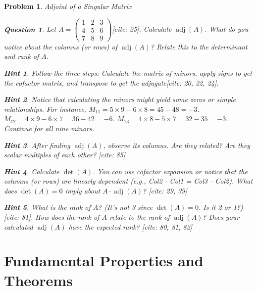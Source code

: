 \documentclass[12pt]{article}
\newtheorem{problem}{Problem}[section]
\newtheorem{question}{Question}[problem]
\theoremstyle{definition}
\newtheorem{hint}{Hint}[question]
\newcommand{\adj}{\operatorname{adj}}
\newcommand{\detm}{\operatorname{det}}
\begin{document}
\begin{problem}{Adjoint of a Singular Matrix}
    \begin{question}
        Let $A = \begin{pmatrix} 1 & 2 & 3 \\ 4 & 5 & 6 \\ 7 & 8 & 9 \end{pmatrix}$[cite: 25]. Calculate $\adj(A)$. What do you notice about the columns (or rows) of $\adj(A)$? Relate this to the determinant and rank of $A$.
    \end{question}
    
        \begin{hint}
            Follow the three steps: Calculate the matrix of minors, apply signs to get the cofactor matrix, and transpose to get the adjugate[cite: 20, 22, 24].
        \end{hint}
        \begin{hint}
            Notice that calculating the minors might yield some zeros or simple relationships. For instance, $M_{11} = 5 \times 9 - 6 \times 8 = 45 - 48 = -3$. $M_{12} = 4 \times 9 - 6 \times 7 = 36 - 42 = -6$. $M_{13} = 4 \times 8 - 5 \times 7 = 32 - 35 = -3$. Continue for all nine minors.
        \end{hint}
        \begin{hint}
            After finding $\adj(A)$, observe its columns. Are they related? Are they scalar multiples of each other? [cite: 85]
        \end{hint}
        \begin{hint}
            Calculate $\detm(A)$. You can use cofactor expansion or notice that the columns (or rows) are linearly dependent (e.g., Col2 - Col1 = Col3 - Col2). What does $\detm(A)=0$ imply about $A \cdot \adj(A)$? [cite: 29, 39]
        \end{hint}
        \begin{hint}
             What is the rank of $A$? (It's not 3 since $\detm(A)=0$. Is it 2 or 1?)[cite: 81]. How does the rank of $A$ relate to the rank of $\adj(A)$? Does your calculated $\adj(A)$ have the expected rank? [cite: 80, 81, 82]
        \end{hint}
    
\end{problem}

\section{Fundamental Properties and Theorems}
\end{document}
